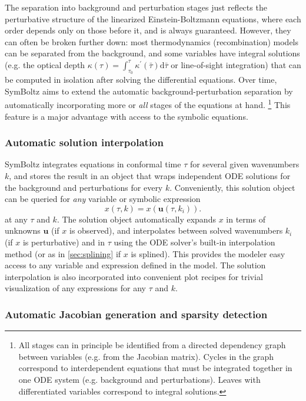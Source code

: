 \documentclass{aa}
\begin{document}
The separation into background and perturbation stages just reflects the perturbative structure of the linearized Einstein-Boltzmann equations, where each order depends only on those before it, and is always guaranteed.
However, they can often be broken further down: most thermodynamics (recombination) models can be separated from the background, and some variables have integral solutions (e.g. the optical depth $\kappa(\tau) = \int_{\tau_0}^\tau \kappa^\prime(\bar\tau) \mathrm{d}\bar\tau$ or line-of-sight integration) that can be computed in isolation after solving the differential equations.
Over time, SymBoltz aims to extend the automatic background-perturbation separation by automatically incorporating more or \emph{all} stages of the equations at hand.%
\footnote{All stages can in principle be identified from a directed dependency graph between variables (e.g. from the Jacobian matrix). Cycles in the graph correspond to interdependent equations that must be integrated together in one ODE system (e.g. background and perturbations). Leaves with differentiated variables correspond to integral solutions.}
This feature is a major advantage with access to the symbolic equations.

\subsubsection{Automatic solution interpolation}
\label{sec:interpolation}

SymBoltz integrates equations in conformal time $\tau$ for several given wavenumbers $k$, and stores the result in an object that wraps independent ODE solutions for the background and perturbations for every $k$.
Conveniently, this solution object can be queried for \emph{any} variable or symbolic expression
\begin{equation}
    x(\tau, k) = x(\boldsymbol{u}(\tau, k_i)).
\end{equation}
at any $\tau$ and $k$.
The solution object automatically expands $x$ in terms of unknowns $\boldsymbol{u}$ (if $x$ is observed), and interpolates between solved wavenumbers $k_i$ (if $x$ is perturbative) and in $\tau$ using the ODE solver's built-in interpolation method (or as in \cref{sec:splining} if $x$ is splined).
This provides the modeler easy access to any variable and expression defined in the model.
The solution interpolation is also incorporated into convenient plot recipes for trivial visualization of any expressions for any $\tau$ and $k$.

\subsubsection{Automatic Jacobian generation and sparsity detection}
\label{sec:jacobian}
\end{document}
